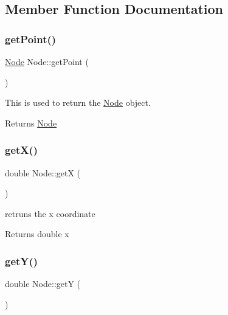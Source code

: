 \subsection{Member Function Documentation}
\mbox{\label{classNode_a667cd139237fd82f1d4d6e784310c42d}} 
\subsubsection{\texorpdfstring{get\+Point()}{getPoint()}}
{\footnotesize\ttfamily \hyperlink{classNode}{Node} Node\+::get\+Point (\begin{DoxyParamCaption}{ }\end{DoxyParamCaption})}



This is used to return the \hyperlink{classNode}{Node} object. 

\begin{DoxyReturn}{Returns}
\hyperlink{classNode}{Node} 
\end{DoxyReturn}
\mbox{\label{classNode_a8d8ccf6a6da7717ea6aa67e52c7c9017}} 
\subsubsection{\texorpdfstring{get\+X()}{getX()}}
{\footnotesize\ttfamily double Node\+::getX (\begin{DoxyParamCaption}{ }\end{DoxyParamCaption})}



retruns the x coordinate 

\begin{DoxyReturn}{Returns}
double x 
\end{DoxyReturn}
\mbox{\label{classNode_a8877121bf44537ccbe2f3c441fa3b664}} 
\subsubsection{\texorpdfstring{get\+Y()}{getY()}}
{\footnotesize\ttfamily double Node\+::getY (\begin{DoxyParamCaption}{ }\end{DoxyParamCaption})}



